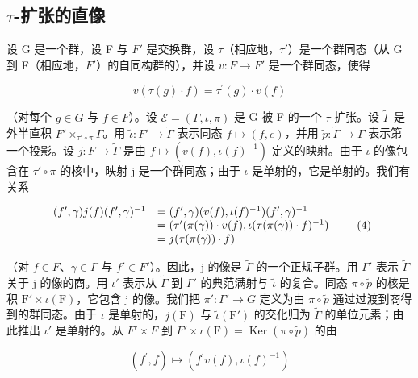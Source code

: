 \subsection{\texorpdfstring{\(\tau\)-扩张的直像}{\textbackslash tau-扩张的直像}}

设 G 是一个群，设 F 与 \(F'\) 是交换群，设 \(\tau\)（相应地，\(\tau'\)）是一个群同态（从 G 到 F（相应地，\(F'\)）的自同构群的），并设 \(v: F \to F'\) 是一个群同态，使得

\[
v (\tau (g) \cdot f) = \tau^ {\prime} (g) \cdot v (f)\tag{3}
\]

（对每个 \(g \in G\) 与 \(f \in F\)）。设 \(\mathcal{E} = (\Gamma, \iota, \pi)\) 是 G 被 F 的一个 \(\tau\)-扩张。设 \(\widetilde{\Gamma}\) 是外半直积 \(F' \times_{\tau' \circ \pi} \Gamma\)。用 \(\widetilde{\iota}: F' \to \widetilde{\Gamma}\) 表示同态 \(f \mapsto (f, e)\)，并用 \(\widetilde{p}: \widetilde{\Gamma} \to \Gamma\) 表示第一个投影。设 \(j: F \to \widetilde{\Gamma}\) 是由 \(f \mapsto (v(f), \iota(f)^{-1})\) 定义的映射。由于 \(\iota\) 的像包含在 \(\tau' \circ \pi\) 的核中，映射 j 是一个群同态；由于 \(\iota\) 是单射的，它是单射的。我们有关系

\[
\begin{array}{r l} (f ^ {\prime}, \gamma) j (f) (f ^ {\prime}, \gamma) ^ {- 1} & = (f ^ {\prime}, \gamma) (v (f), \iota (f) ^ {- 1}) (f ^ {\prime}, \gamma) ^ {- 1} \\ & = (\tau^ {\prime} (\pi (\gamma)) \cdot v (f), \iota (\tau (\pi (\gamma)) \cdot f) ^ {- 1}) \\ & = j (\tau (\pi (\gamma)) \cdot f) \end{array}\tag{4}
\]

（对 \(f \in F\)、\(\gamma \in \Gamma\) 与 \(f' \in F'\)）。因此，j 的像是 \(\widetilde{\Gamma}\) 的一个正规子群。用 \(\Gamma'\) 表示 \(\widetilde{\Gamma}\) 关于 j 的像的商。用 \(\iota'\) 表示从 \(\widetilde{\Gamma}\) 到 \(\Gamma'\) 的典范满射与 \(\widetilde{\iota}\) 的复合。同态 \(\pi \circ \widetilde{p}\) 的核是积 \(\mathrm{F}' \times \iota(\mathrm{F})\)，它包含 j 的像。我们把 \(\pi' : \Gamma' \to G\) 定义为由 \(\pi \circ \widetilde{p}\) 通过过渡到商得到的群同态。由于 \(\iota\) 是单射的，\(j(\mathrm{F})\) 与 \(\widetilde{\iota}(\mathrm{F}')\) 的交化归为 \(\widetilde{\Gamma}\) 的单位元素；由此推出 \(\iota'\) 是单射的。从 \(F' \times F\) 到 \(F' \times \iota(\mathrm{F}) = \operatorname{Ker}(\pi \circ \widetilde{p})\) 的由

\[
(f ^ {\prime}, f) \longmapsto (f ^ {\prime} v (f), \iota (f) ^ {- 1})
\]

